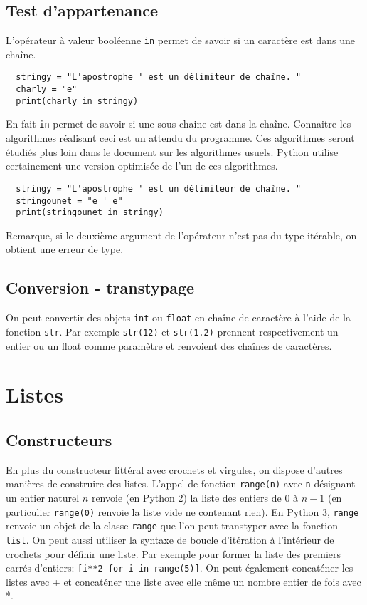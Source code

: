 \subsection{Test d'appartenance}
L'opérateur à valeur booléenne \texttt{in} permet de savoir si un caractère est dans une chaîne.
\begin{verbatim}
  stringy = "L'apostrophe ' est un délimiteur de chaîne. "
  charly = "e"
  print(charly in stringy)\end{verbatim}
En fait \texttt{in} permet de savoir si une sous-chaine est dans la chaîne. Connaitre les algorithmes réalisant ceci est un attendu du programme. Ces algorithmes seront étudiés plus loin dans le document sur les algorithmes usuels. Python utilise certainement une version optimisée de l'un de ces algorithmes.   
\begin{verbatim}
  stringy = "L'apostrophe ' est un délimiteur de chaîne. "
  stringounet = "e ' e"
  print(stringounet in stringy)\end{verbatim}
Remarque, si le deuxième argument de l'opérateur n'est pas du type itérable, on obtient une erreur de type.

\subsection{Conversion - transtypage}
On peut convertir des objets \texttt{int} ou \texttt{float} en chaîne de caractère à l'aide de la fonction \texttt{str}. Par exemple \texttt{str(12)} et \texttt{str(1.2)} prennent respectivement un entier ou un float comme paramètre et renvoient des chaînes de caractères.

\section{Listes}
\subsection{Constructeurs}
En plus du constructeur littéral avec crochets et virgules, on dispose d'autres manières de construire des listes.\newline
L'appel de fonction \verb|range(n)| avec \verb|n| désignant un entier naturel $n$ renvoie (en Python 2) la liste des entiers de $0$ à $n-1$ (en particulier \verb|range(0)| renvoie la liste vide ne contenant rien). En Python 3, \texttt{range} renvoie un objet de la classe \texttt{range} que l'on peut transtyper avec la fonction \texttt{list}.\newline
On peut aussi utiliser la syntaxe de boucle d'itération à l'intérieur de crochets pour définir une liste. Par exemple pour former la liste des premiers carrés d'entiers: \verb|[i**2 for i in range(5)]|.\newline
On peut également concaténer les listes avec + et concaténer une liste avec elle même un nombre entier de fois avec *.

